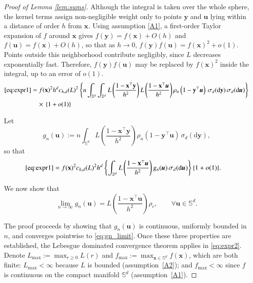\documentclass[12pt]{report} %
\newcommand{\bx}{\mathbf{x}}
\newcommand{\by}{\mathbf{y}}
\newcommand{\bu}{\boldsymbol{u}}
\newcommand{\sigmad}{\sigma_{d}}
\newcommand{\Sd}{\mathbb{S}^{d}}
\begin{document}
\begin{proof}[Proof of Lemma \ref{lem:sums}]
Although the integral is taken over the whole sphere, the kernel terms assign non-negligible weight only to points $\by$ and $\bu$ lying within a distance of order $h$ from $\bx$. Using assumption \ref{A1}, a first-order Taylor expansion of $f$ around $\bx$ gives $f(\by) = f(\bx) + O(h)$ and $f(\bu) = f(\bx)+ O(h)$, so that as $h \to 0$, $f(\by)f(\bu) = f(\bx)^2 + o(1)$. Points outside this neighborhood contribute negligibly, since $L$ decreases exponentially fast. Therefore, $f(\by)f(\bu)$ may be replaced by $f(\bx)^2$ inside the integral, up to an error of $o(1)$.
\begin{align}
    \eqref{eq:expr1} &= f(\bx)^2 h^d  c_{h,d}(L)^2 \left\{ n 
    \int_{\Sd} \int_{\Sd}
    L\left(\frac{1 - \bx^\top \by}{h^2}\right)
    L\left(\frac{1 - \bx^\top \bu}{h^2}\right)
    \rho_n\left(1 - \by^\top \bu\right)
    \,\sigmad(\mathrm{d}\by)
    \,\sigmad(\mathrm{d}\bu)
\right\} \nonumber \\ 
&\quad\times \,\{1+o(1)\}
\end{align}

Let
\begin{equation}
    \label{eq:gn}
    g_n(\bu) := n \int_{\Sd} 
    L\left(\frac{1 - \bx^\top \by}{h^2}\right)
    \rho_n\left(1 - \by^\top \bu\right)
    \,\sigmad(\mathrm{d}\by),
\end{equation}
so that
\begin{align}
    \eqref{eq:expr1} &= f(\bx)^2 c_{h,d}(L)^2 h^d \left\{
    \int_{\Sd}
    L\left(\frac{1 - \bx^\top \bu}{h^2}\right)
    g_n(\bu)
    \,\sigmad(\mathrm{d}\bu)
    \right\} \{1+o(1)\}. \label{eq:expr2}
\end{align}

We now show that 
\begin{equation}
    \label{eq:gn_limit}
    \lim _{n \rightarrow \infty}g_n(\bu)  = L\!\left(\dfrac{1-\bx^\top \bu}{h^2}\right)\rho_c,  \qquad \forall \bu \in \Sd.
\end{equation}




The proof proceeds by showing that $g_n(\bu)$ is continuous, uniformly bounded in $n$, and converges pointwise to \eqref{eq:gn_limit}. Once these three properties are established, the Lebesgue dominated convergence theorem applies in \eqref{eq:expr2}. Denote $L_{\max} := \max_{r \geq 0} L(r)$ and $f_{\max} := \max_{\bx \in \Sd} f(\bx)$, which are both finite: $L_{\max} < \infty$ because $L$ is bounded (assumption~\ref{A2}); and $f_{\max} < \infty$ since $f$ is continuous on the compact manifold $\Sd$ (assumption~\ref{A1}). 


\end{proof}
\end{document}
